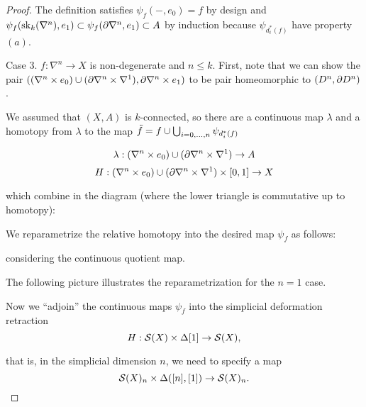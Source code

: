 \begin{proof}
The definition satisfies $\psi_f(-,e_0)=f$ by design and $\psi_f(\sk_k(\nabla^n),e_1)\subset\psi_f(\de\nabla^n,e_1)\subset A$ by induction because $\psi_{d_i^*(f)}$ have property $(a)$.

Case 3. $f:\nabla^n\to X$ is non-degenerate and $n\leq k$. First, note that we can show the pair $((\nabla^n\times e_0)\cup(\de\nabla^n\times\nabla^1), \de\nabla^n\times e_1)$ to be pair homeomorphic to $(D^n,\de D^n)$.

We assumed that $(X,A)$ is $k$-connected, so there are a continuous map $\lambda$ and a homotopy from $\lambda$ to the map $\til f=f\cup\bigcup_{i=0,\dots,n} \psi_{d_i^*(f)}$

\[\lambda:(\nabla^n\times e_0)\cup(\de\nabla^n\times\nabla^1)\to A\]
\[H:(\nabla^n\times e_0)\cup(\de\nabla^n\times\nabla^1)\times[0,1]\to X\]

which combine in the diagram (where the lower triangle is commutative up to homotopy):
\begin{center}
\end{center}

\smallskip

\bigskip

We reparametrize the relative homotopy into the desired map $\psi_f$ as follows:
\begin{center}
\end{center}
considering the continuous quotient map.

The following picture illustrates the reparametrization for the $n=1$ case.

\smallskip

\bigskip

Now we \enquote{adjoin} the continuous maps $\psi_f$ into the simplicial deformation retraction
\[H:\S(X)\times\Delta[1]\to \S(X),\]

that is, in the simplicial dimension $n$, we need to specify a map
\[\S(X)_n\times\Delta([n],[1])\to \S(X)_n.\]


\end{proof}

